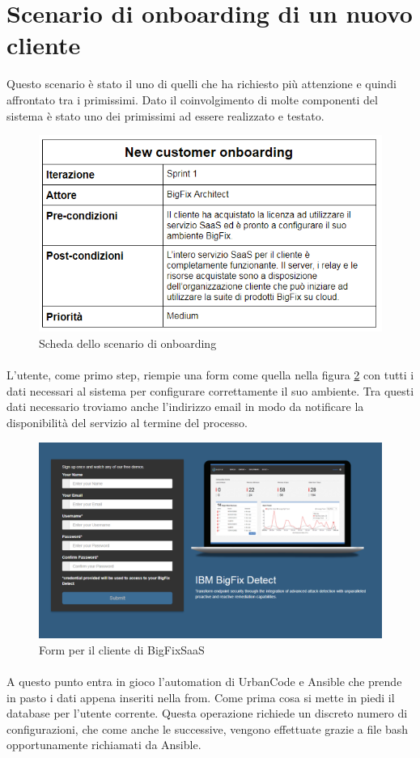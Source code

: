 \section{Scenario di onboarding di un nuovo cliente}
Questo scenario è stato il uno di quelli che ha richiesto più attenzione e quindi affrontato tra i primissimi. Dato il coinvolgimento di molte componenti del sistema è stato uno dei primissimi ad essere realizzato e testato. 
\begin{figure}
	\centering
	\includegraphics[width=0.7\linewidth]{capitoli/imgs/onbordingScenarioScheda}
	\caption{Scheda dello scenario di onboarding}
	\label{fig:onbordingscenarioscheda}
\end{figure}
\paragraph{}
L'utente, come primo step, riempie una form come quella nella figura \ref{fig:saasform} con tutti i dati necessari al sistema per configurare correttamente il suo ambiente. Tra questi dati necessario troviamo anche l'indirizzo email in modo da notificare la disponibilità del servizio al termine del processo. 
\begin{figure}
	\centering
	\includegraphics[width=0.7\linewidth]{capitoli/imgs/saasForm}
	\caption{Form per il cliente di BigFixSaaS}
	\label{fig:saasform}
\end{figure}
\paragraph{}
A questo punto entra in gioco l'automation di UrbanCode e Ansible che prende in pasto i dati appena inseriti nella from. Come prima cosa si mette in piedi il database per l'utente corrente. Questa operazione richiede un discreto numero di configurazioni, che come anche le successive, vengono effettuate grazie a file bash opportunamente richiamati da Ansible. 
